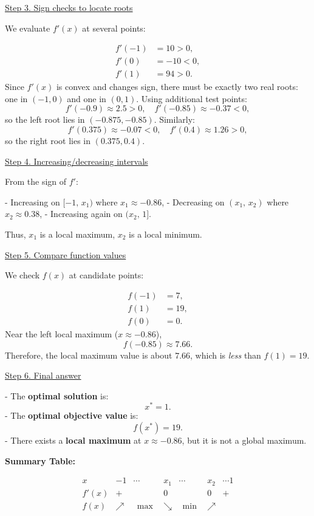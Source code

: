 \documentclass{article}
\begin{document}
\begin{enumerate}
\medskip
\underline{Step 3. Sign checks to locate roots}

We evaluate $f'(x)$ at several points:

\[
\begin{aligned}
f'(-1) &= 10 > 0, \\
f'(0) &= -10 < 0, \\
f'(1) &= 94 > 0.
\end{aligned}
\]
Since $f'(x)$ is convex and changes sign, there must be exactly two real roots: one in $(-1,0)$ and one in $(0,1)$.  
Using additional test points:
\[
f'(-0.9) \approx 2.5 > 0, \quad f'(-0.85) \approx -0.37 < 0,
\]
so the left root lies in $(-0.875, -0.85)$.  
Similarly:
\[
f'(0.375) \approx -0.07 < 0,\quad f'(0.4) \approx 1.26 > 0,
\]
so the right root lies in $(0.375, 0.4)$.

\medskip
\underline{Step 4. Increasing/decreasing intervals}

From the sign of $f'$:

- Increasing on $[-1, \, x_1)$ where $x_1 \approx -0.86$,
- Decreasing on $(x_1, \, x_2)$ where $x_2 \approx 0.38$,
- Increasing again on $(x_2, \, 1]$.

Thus, $x_1$ is a local maximum, $x_2$ is a local minimum.

\medskip
\underline{Step 5. Compare function values}

We check $f(x)$ at candidate points:

\[
\begin{aligned}
f(-1) &= 7, \\
f(1) &= 19, \\
f(0) &= 0.
\end{aligned}
\]
Near the left local maximum ($x \approx -0.86$),  
\[
f(-0.85) \approx 7.66.
\]
Therefore, the local maximum value is about $7.66$, which is \emph{less} than $f(1)=19$.

\medskip
\underline{Step 6. Final answer}

- The \textbf{optimal solution} is:
\[
x^\ast = 1.
\]
- The \textbf{optimal objective value} is:
\[
f(x^\ast) = 19.
\]
- There exists a \textbf{local maximum} at $x \approx -0.86$, but it is not a global maximum.

\hrulefill

\textbf{Summary Table:}

\[
\begin{array}{c|cccccc}
x & -1 & \cdots & x_1 & \cdots & x_2 & \cdots 1 \\ \hline
f'(x) & + & & 0 & & 0 & + \\
f(x) & \nearrow & \ \ \max\ \  & \searrow & \ \ \min\ \  & \nearrow &
\end{array}
\]



\end{enumerate}
\end{document}
